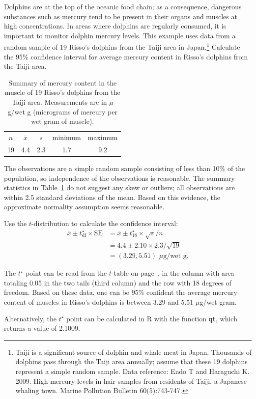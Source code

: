 \begin{example}{Dolphins are at the top of the oceanic food chain; as a consequence, dangerous substances such as mercury tend to be present in their organs and muscles at high concentrations. In areas where dolphins are regularly consumed, it is important to monitor dolphin mercury levels. This example uses data from a random sample of 19 Risso's dolphins from the Taiji area in Japan.\footnote{Taiji is a significant source of dolphin and whale meat in Japan. Thousands of dolphins pass through the Taiji area annually; assume that these 19 dolphins represent a simple random sample. Data reference: Endo T and Haraguchi K. 2009. High mercury levels in hair samples from residents of Taiji, a Japanese whaling town. Marine Pollution Bulletin 60(5):743-747.} Calculate the 95\% confidence interval for average mercury content in Risso's dolphins from the Taiji area.
		
\begin{table}[h]
	\centering
	\begin{tabular}{ccc cc}
		\hline
		$n$ & $\overline{x}$ & $s$ & minimum & maximum \\
		19   & 4.4	  & 2.3  & 1.7	       & 9.2 \\
		\hline
	\end{tabular}
	\caption{Summary of mercury content in the muscle of 19 Risso's dolphins from the Taiji area. Measurements are in $\mu$g/wet g (micrograms of mercury per wet gram of muscle).}
	\label{summaryStatsOfHgInMuscleOfRissosDolphins}
\end{table}		
		
} %

The observations are a simple random sample consisting of less than 10\% of the population, so independence of the observations is reasonable. The summary statistics in Table~\ref{summaryStatsOfHgInMuscleOfRissosDolphins} do not suggest any skew or outliers; all observations are within 2.5 standard deviations of the mean. Based on this evidence, the approximate normality assumption seems reasonable.

Use the $t$-distribution to calculate the confidence interval:
\begin{align*}
\overline{x} \pm  t^{\star}_{\text{df}} \times \text{SE} &= \overline{x}  \pm  t^{\star}_{18}  \times \sqrt{s}/n \\
&= 4.4 \pm  2.10 \times 2.3/\sqrt{19} \\
&= (3.29, 5.51)\,\, \mu\text{g/wet g}.
\end{align*}

The $t^{\star}$ point can be read from the $t$-table on page~\pageref{tTableSample}, in the column with area totaling 0.05 in the two tails (third column) and the row with 18 degrees of freedom. Based on these data, one can be 95\% confident the average mercury content of muscles in Risso's dolphins is between 3.29 and 5.51 $\mu$g/wet gram.

Alternatively, the $t^\star$ point can be calculated in \textsf{R} with the function \texttt{qt}, which returns a value of 2.1009.

\end{example}


